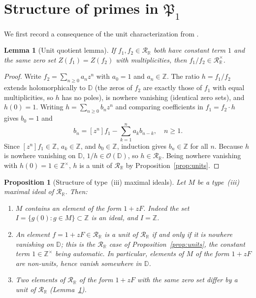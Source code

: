\documentclass[12pt]{amsart}
\newtheorem{lemma}[theorem]{Lemma}
\newtheorem{proposition}[theorem]{Proposition}
\theoremstyle{definition}
\newcommand{\D}{\mathbb{D}}
\newcommand{\Z}{\mathbb{Z}}
\newcommand{\OD}{\mathcal{O}(\D)}
\newcommand{\mRR}{\mathcal{R}_{\mathbb{R}}}
\begin{document}
\section{Structure of primes in $\mathfrak{P}_1$}
\label{sec:invariant}

We first record a consequence of the unit characterization from
\cite{PaperI}.

\begin{lemma}[Unit quotient lemma]
\label{lem:unitquotient}
If $f_1, f_2 \in \mRR$ both have constant term $1$ and the same zero set
$Z(f_1) = Z(f_2)$ with multiplicities, then $f_1/f_2 \in \mRR^\times$.
\end{lemma}

\begin{proof}
Write $f_2 = \sum_{n \geq 0} a_n z^n$ with $a_0 = 1$ and $a_n \in \Z$.
The ratio $h = f_1/f_2$ extends holomorphically to $\D$ (the zeros of
$f_2$ are exactly those of $f_1$ with equal multiplicities, so $h$ has
no poles), is nowhere vanishing (identical zero sets), and $h(0) = 1$.
Writing $h = \sum_{n \geq 0} b_n z^n$ and comparing coefficients in $f_1
= f_2 \cdot h$ gives $b_0 = 1$ and
\[
  b_n = [z^n]f_1 - \sum_{k=1}^n a_k b_{n-k}, \quad n \geq 1.
\]
Since $[z^n]f_1 \in \Z$, $a_k \in \Z$, and $b_0 \in \Z$, induction gives
$b_n \in \Z$ for all $n$.  Because $h$ is nowhere vanishing on $\D$, $1/h
\in \OD$, so $h \in \mRR$.  Being nowhere vanishing with $h(0) = 1 \in
\Z^\times$, $h$ is a unit of $\mRR$ by Proposition~\ref{prop:units}.
\end{proof}

\begin{proposition}[Structure of type~(iii) maximal ideals]
\label{prop:interesting}
Let $M$ be a type~(iii) maximal ideal of $\mRR$.  Then:
\begin{enumerate}
\item[(i)] $M$ contains an element of the form $1 + zF$.  Indeed the set
  $I = \{g(0) : g \in M\} \subset \Z$ is an ideal, and $I = \Z$.
\item[(ii)] An element $f = 1 + zF \in \mRR$ is a unit of $\mRR$ if and
  only if it is nowhere vanishing on $\D$; this is the $\mRR$ case of
  Proposition~\ref{prop:units}, the constant term $1 \in \Z^\times$
  being automatic.  In particular, elements of $M$ of the form $1 + zF$
  are non-units, hence vanish somewhere in $\D$.
\item[(iii)] Two elements of $\mRR$ of the form $1 + zF$ with the same
  zero set differ by a unit of $\mRR$ (Lemma~\ref{lem:unitquotient}).
\end{enumerate}
\end{proposition}
\end{document}
